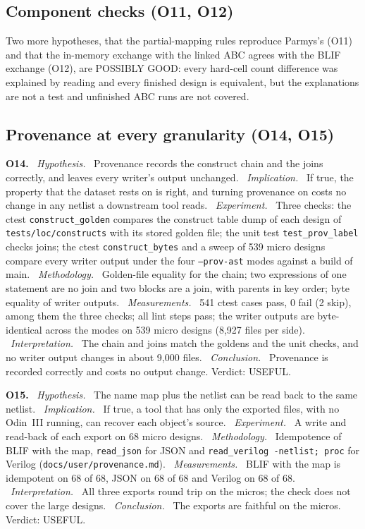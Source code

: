 \documentclass[conference]{IEEEtran}
\newcommand{\code}[1]{\texttt{#1}}
\newcommand{\argid}[1]{\par\smallskip\noindent\textbf{#1.}}
\newcommand{\ah}[1]{\ \textit{#1.}\ }
\begin{document}
\subsection{Component checks (O11, O12)}

Two more hypotheses, that the partial-mapping rules reproduce Parmys's (O11) and that the in-memory exchange with the linked ABC agrees with the BLIF exchange (O12), are POSSIBLY GOOD: every hard-cell count difference was explained by reading and every finished design is equivalent, but the explanations are not a test and unfinished ABC runs are not covered.

\subsection{Provenance at every granularity (O14, O15)}
\label{sec:q-prov}

\argid{O14}
\ah{Hypothesis} Provenance records the construct chain and the joins correctly, and leaves every writer's output unchanged.
\ah{Implication} If true, the property that the dataset rests on is right, and turning provenance on costs no change in any netlist a downstream tool reads.
\ah{Experiment} Three checks: the ctest \code{construct\_golden} compares the construct table dump of each design of \code{tests/loc/constructs} with its stored golden file; the unit test \code{test\_prov\_label} checks joins; the ctest \code{construct\_bytes} and a sweep of 539 micro designs compare every writer output under the four \code{--prov-ast} modes against a build of main.
\ah{Methodology} Golden-file equality for the chain; two expressions of one statement are no join and two blocks are a join, with parents in key order; byte equality of writer outputs.
\ah{Measurements} 541 ctest cases pass, 0 fail (2 skip), among them the three checks; all lint steps pass; the writer outputs are byte-identical across the modes on 539 micro designs (8,927 files per side).
\ah{Interpretation} The chain and joins match the goldens and the unit checks, and no writer output changes in about 9,000 files.
\ah{Conclusion} Provenance is recorded correctly and costs no output change. Verdict: USEFUL.

\argid{O15}
\ah{Hypothesis} The name map plus the netlist can be read back to the same netlist.
\ah{Implication} If true, a tool that has only the exported files, with no Odin~III running, can recover each object's source.
\ah{Experiment} A write and read-back of each export on 68 micro designs.
\ah{Methodology} Idempotence of BLIF with the map, \code{read\_json} for JSON and \code{read\_verilog -netlist; proc} for Verilog (\code{docs/user/provenance.md}).
\ah{Measurements} BLIF with the map is idempotent on 68 of 68, JSON on 68 of 68 and Verilog on 68 of 68.
\ah{Interpretation} All three exports round trip on the micros; the check does not cover the large designs.
\ah{Conclusion} The exports are faithful on the micros. Verdict: USEFUL.
\end{document}
